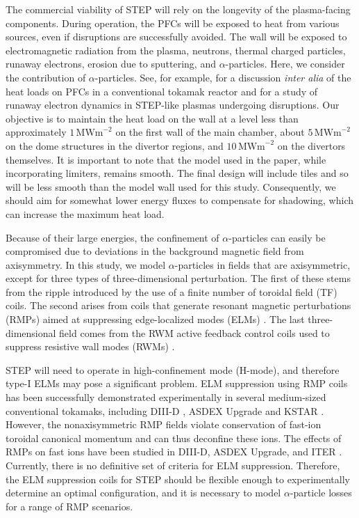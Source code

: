 \documentclass[10pt, a4paper, twoside]{article}
\begin{document}
The commercial viability of STEP will rely on the longevity of the plasma-facing components. During operation, the PFCs will be exposed to heat from various sources, even if disruptions are successfully avoided. The wall will be exposed to electromagnetic radiation from the plasma, neutrons, thermal charged particles, runaway electrons, erosion due to sputtering, and $\alpha$-particles. Here, we consider the contribution of $\alpha$-particles. See, for example, \cite{bachmann2018} for a discussion {\it inter alia} of the heat loads on PFCs in a conventional tokamak reactor and \cite{Berger2022} for a study of runaway electron dynamics in STEP-like plasmas undergoing disruptions. Our objective is to maintain the heat load on the wall at a level less than approximately $1\, \text{MWm}^{-2}$ on the first wall of the main chamber, about $5\, \text{MWm}^{-2}$ on the dome structures in the divertor regions, and $10\, \text{MWm}^{-2}$ on the divertors themselves. It is important to note that the model used in the paper, while incorporating limiters, remains smooth. The final design will include tiles and so will be less smooth than the model wall used for this study. Consequently, we should aim for somewhat lower energy fluxes to compensate for shadowing, which can increase the maximum heat load.

Because of their large energies, the confinement of $\alpha$-particles can easily be compromised due to deviations in the background magnetic field from axisymmetry.  In this study, we model $\alpha$-particles in fields that are axisymmetric, except for three types of three-dimensional perturbation. The first of these stems from the ripple introduced by the use of a finite number of toroidal field (TF) coils. The second arises from coils that generate resonant magnetic perturbations (RMPs) aimed at suppressing edge-localized modes (ELMs) \cite{zohm1996}. The last three-dimensional field comes from the RWM active feedback control coils used to suppress resistive wall modes (RWMs) \cite{xia2023}.

STEP will need to operate in high-confinement mode (H-mode), and therefore type-I ELMs may pose a significant problem. ELM suppression using RMP coils has been successfully demonstrated experimentally in several medium-sized conventional tokamaks, including DIII-D \cite{Evans2008}, ASDEX Upgrade \cite{suttrop2018} and KSTAR \cite{In2019}. However, the nonaxisymmetric RMP fields violate conservation of fast-ion toroidal canonical momentum and can thus deconfine these ions. The effects of RMPs on fast ions have been studied in DIII-D, ASDEX Upgrade, and ITER \cite{van2015,sanchis2018,ward2022}. Currently, there is no definitive set of criteria for ELM suppression. Therefore, the ELM suppression coils for STEP should be flexible enough to experimentally determine an optimal configuration, and it is necessary to model $\alpha$-particle losses for a range of RMP scenarios.
\end{document}
